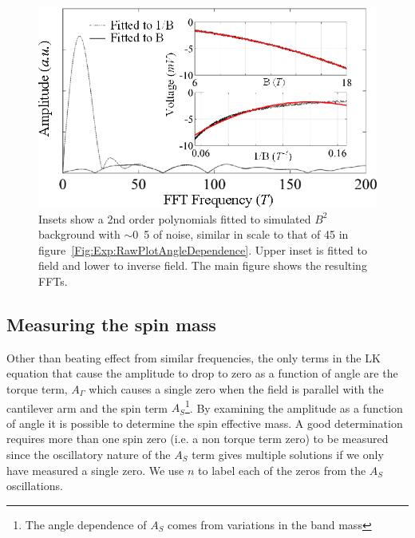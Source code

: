\begin{figure}[h!]
    \begin{center}
        \includegraphics[scale=1.1]{Chapter-ExperimentalTechnique/Figures/ComparisonBackgroundSubtraction/ComparisonBackgroundSubtraction}
        \caption{Insets show a 2nd order polynomials fitted to simulated $B^2$ background with $\sim$\unit{0.5}{\milli\volt} of noise, similar in scale to that of \unit{45}{\degree} in figure~\ref{Fig:Exp:RawPlotAngleDependence}. Upper inset is fitted to field and lower to inverse field. The main figure shows the resulting \acp{FFT}.}
        \label{Fig:Exp:BackgroundSubtraction}
    \end{center}
\end{figure}

\subsection{Measuring the spin mass}
\label{Sec:Exp:MeasuringSpinMass}

Other than beating effect from similar frequencies, the only terms in the \ac{LK} equation that cause the amplitude to drop to zero as a function of angle are the torque term, $A_\Gamma$ which causes a single zero when the field is parallel with the cantilever arm and the spin term $A_S$\footnote{The angle dependence of $A_S$ comes from variations in the band mass}. By examining the amplitude as a function of angle it is possible to determine the spin effective mass. A good determination requires more than one spin zero (i.e. a non torque term zero) to be measured since the oscillatory nature of the $A_S$ term gives multiple solutions if we only have measured a single zero. We use $n$ to label each of the zeros from the $A_S$ oscillations.

